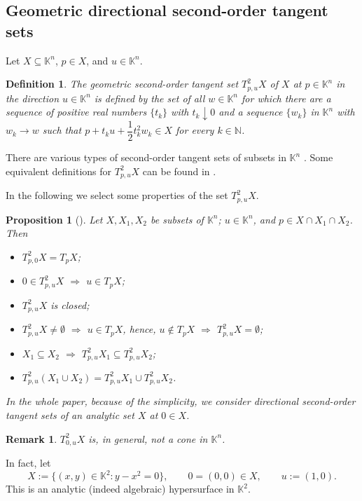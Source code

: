 \documentclass[10pt,reqno]{amsart}
\theoremstyle{break-italic}
\theoremstyle{break-italic}
\theoremstyle{break-italic}
\theoremstyle{break-italic}
\theoremstyle{break-italic}
\theoremstyle{break-italic}
\theoremstyle{break-italic}
\theoremstyle{break-italic}
\newtheorem{Proposition}[satz]{Proposition}
\theoremstyle{break-roman}
\newtheorem{definition}[satz]{Definition}
\newtheorem{remark}[satz]{Remark}
\theoremstyle{standard}
\theoremstyle{varthm-roman}
\theoremstyle{varthm-italic}
\theoremstyle{varthm-roman-break}
\theoremstyle{varthm-italic-break}
\theoremstyle{varthm-roman-no-punctuation}
\theoremstyle{varthm-italic-no-punctuation}
\numberwithin{equation}{section}
\def\df{\begin{definition}}
\def\edf{\end{definition}}
\begin{document}
\subsection{Geometric directional second-order tangent sets}
 
Let $X\subseteq \mathbb K^n$, $p\in X$, and $u\in \mathbb K^n$. 

  \df \label{def:2.3} \rm The \textit{geometric second-order tangent set} $T^2_{p,u} X$ of $X$ \textit{at $p \in \mathbb K^n$} \textit{in the direction} $u\in \mathbb K^n$ is defined by the set of all $w\in \mathbb K^n$ for which there are a sequence of positive real numbers $\{t_k\}$ with $t_k \downarrow 0$ and a sequence $\{w_k\}$ in $\mathbb K^n$ with $w_k \rightarrow w$ such that $p+t_ku+\dfrac{1}{2}t_k^2w_k \in X$ for every $k\in \mathbb N$.
\edf 

There are various types of second-order tangent sets of subsets in $\mathbb K^n$ \cite[Section 4.9]{KTZ15}.  Some equivalent definitions for  $T^2_{p,u} X$ can be found in \cite[Theorem 4.9.4]{KTZ15}. 

In the following we select some properties of the set $T^2_{p,u}X$. 

\begin{Proposition}[{\cite[Theorem 4.9.5]{KTZ15}}] \label{propertyT2} Let $X, X_1, X_2$ be subsets of $\mathbb K^n$; $u \in \mathbb K^n$, and $p \in X \cap X_1 \cap X_2$. Then 
\begin{itemize}
\item[(1)] $T^2_{p,0} X = T_p X$;
\item[(2)] $0\in T^2_{p,u}X $ $\Rightarrow $ $u\in T_pX$;
\item[(3)] $T^2_{p,u}X$ is closed;
\item[(4)] $T^2_{p,u}X \not = \emptyset $ $\Rightarrow $ $u\in T_p X$, hence, $u\not \in T_pX$ $\Rightarrow $ $T^2_{p,u}X = \emptyset$;
\item[(5)] $X_1\subseteq X_2$ $\Rightarrow$ $T^2_{p,u}X_1 \subseteq T^2_{p,u}X_2$;
\item[(6)] $T^2_{p,u} (X_1\cup X_2) = T^2_{p,u}X_1 \cup T^2_{p,u}X_2$.
\end{itemize} 
\end{Proposition}

\textit{In the whole paper, because of the simplicity, we  consider directional second-order tangent sets of an analytic set $X$ at $0 \in X$. }

\begin{remark} \rm $T^2_{0,u}X$ is, in general, not a cone in $\mathbb K^n$. 
\end{remark}
In fact,  let 
\[
X:=\{(x,y)\in \mathbb K^2 : y-x^2=0\},
\qquad 0=(0,0)\in X,
\qquad u:=(1,0).
\]
This is an analytic (indeed algebraic) hypersurface in $\mathbb K^2$.
\end{document}
